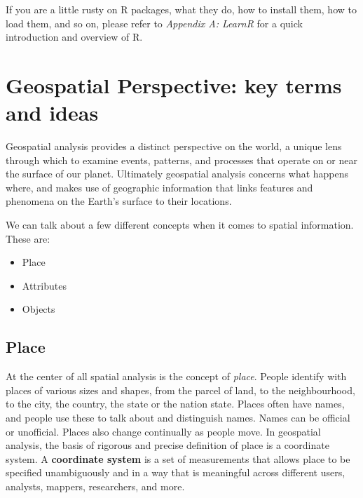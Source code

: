 \documentclass[
]{book}
\providecommand{\tightlist}{%
  \setlength{\itemsep}{0pt}\setlength{\parskip}{0pt}}
\begin{document}
If you are a little rusty on R packages, what they do, how to install them, how to load them, and so on, please refer to \emph{Appendix A: LearnR} for a quick introduction and overview of R.

\hypertarget{geospatial-perspective-key-terms-and-ideas}{%
\section{Geospatial Perspective: key terms and ideas}\label{geospatial-perspective-key-terms-and-ideas}}

Geospatial analysis provides a distinct perspective on the world, a unique lens through which to examine events, patterns, and processes that operate on or near the surface of our planet. Ultimately geospatial analysis concerns what happens where, and makes use of geographic information that links features and phenomena on the Earth's surface to their locations.

We can talk about a few different concepts when it comes to spatial information. These are:

\begin{itemize}
\tightlist
\item
  Place
\item
  Attributes
\item
  Objects
\end{itemize}

\hypertarget{place}{%
\subsection{Place}\label{place}}

At the center of all spatial analysis is the concept of \emph{place}. People identify with places of various sizes and shapes, from the parcel of land, to the neighbourhood, to the city, the country, the state or the nation state. Places often have names, and people use these to talk about and distinguish names. Names can be official or unofficial. Places also change continually as people move. In geospatial analysis, the basis of rigorous and precise definition of place is a coordinate system. A \textbf{coordinate system} is a set of measurements that allows place to be specified unambiguously and in a way that is meaningful across different users, analysts, mappers, researchers, and more.
\end{document}
